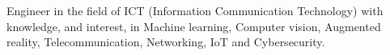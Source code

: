 %
%
%
\par{
Engineer in the field of ICT (Information Communication Technology) with knowledge, and interest, in Machine learning, Computer vision, Augmented reality, Telecommunication, Networking, IoT and Cybersecurity.
}